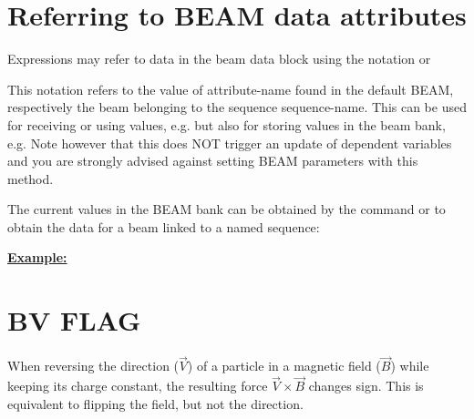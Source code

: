 \section{Referring to BEAM data attributes}
 
Expressions may refer to data in the beam data block using the
notation  
or 

This notation refers to the value of attribute-name found in the default
BEAM, respectively the beam belonging to the sequence sequence-name. 
This can be used for receiving or using values, e.g. 
but also for storing values in the beam bank, e.g.  
Note however that this does NOT trigger an update of dependent variables
and you are strongly advised against setting BEAM parameters with this method.

The current values in the BEAM bank can be obtained by the command
or to obtain the data for a beam linked to a named sequence:


{\bf \underline{Example:}} 





\section{BV FLAG}
\label{sec:bvflag}
When reversing the direction ($\vec V$) of a particle in a magnetic field
($\vec B$) while keeping its charge constant, the resulting force $\vec
V \times \vec B$ changes sign. This is equivalent to flipping the field,
but not the direction.  

